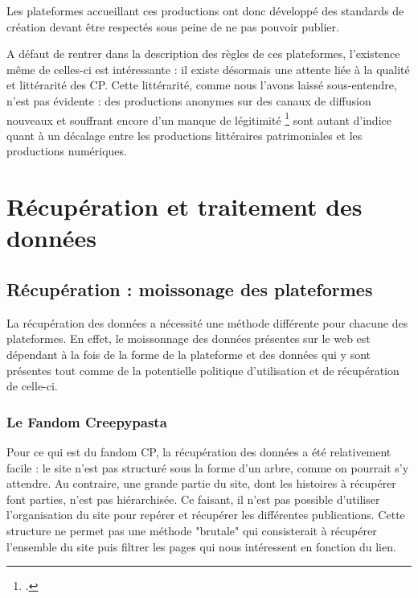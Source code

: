 \documentclass[12pt,a4paper,oneside,titlepage]{book} %
\begin{document}
	Les plateformes accueillant ces productions ont donc développé des standards de création devant être respectés sous peine de ne pas pouvoir publier. 
	
	A défaut de rentrer dans la description des règles de ces plateformes, l'existence même de celles-ci est intéressante : il existe désormais une attente liée à la qualité et littérarité des CP. Cette littérarité, comme nous l'avons laissé sous-entendre, n'est pas évidente : des productions anonymes sur des canaux de diffusion nouveaux et souffrant encore d'un manque de légitimité \footcite{saemmer_litterature_2011} sont autant d'indice quant à un décalage entre les productions littéraires patrimoniales et les productions numériques.
	
	
	

		\part{Récupération et traitement des données}
		
		\chapter{Récupération : moissonage des plateformes}
	
	La récupération des données a nécessité une méthode différente pour chacune des plateformes.  En effet, le moissonnage des données présentes sur le web est dépendant à la fois de la forme de la plateforme et des données qui y sont présentes tout comme de la potentielle politique d'utilisation et de récupération de celle-ci. 
	
	\section{Le Fandom Creepypasta}
	Pour ce qui est du fandom CP, la récupération des données a été relativement facile : le site n'est pas structuré sous la forme d'un arbre, comme on pourrait s'y attendre. Au contraire, une grande partie du site, dont les histoires à récupérer font parties, n'est pas hiérarchisée. Ce faisant, il n'est pas possible d'utiliser l'organisation du site pour repérer et récupérer les différentes publications.
	Cette structure ne permet pas une méthode "brutale" qui consisterait à récupérer l'ensemble du site puis filtrer les pages qui nous intéressent en fonction du lien.
	
\end{document}

